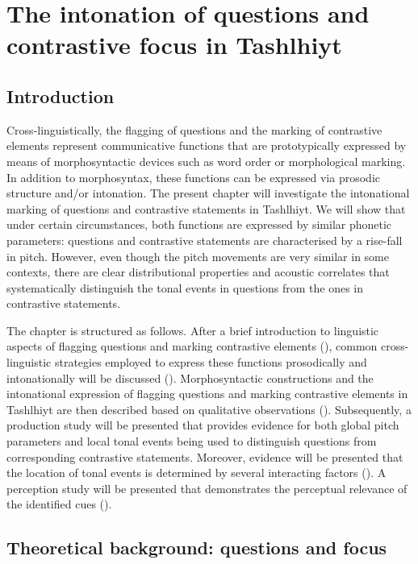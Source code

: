 \chapter{The intonation of questions and contrastive focus in Tashlhiyt}
\section{Introduction}
Cross-linguistically, the flagging of questions and the marking of contrastive elements represent communicative functions that are prototypically expressed by means of morphosyntactic devices such as word order or morphological marking. In addition to morphosyntax, these functions can be expressed via prosodic structure and/or intonation. The present chapter will investigate the intonational marking of questions and contrastive statements in Tashlhiyt. We will show that under certain circumstances, both functions are expressed by similar phonetic parameters: questions and contrastive statements are characterised by a rise-fall in pitch. However, even though the pitch movements are very similar in some contexts, there are clear distributional properties and acoustic correlates that systematically distinguish the tonal events in questions from the ones in contrastive statements.

The chapter is structured as follows. After a brief introduction to linguistic aspects of flagging questions and marking contrastive elements (), common cross-linguistic strategies employed to express these functions prosodically and intonationally will be discussed (). Morphosyntactic constructions and the intonational expression of flagging questions and marking contrastive elements in Tashlhiyt are then described based on qualitative observations (). Subsequently, a production study will be presented that provides evidence for both global pitch parameters and local tonal events being used to distinguish questions from corresponding contrastive statements. Moreover, evidence will be presented that the location of tonal events is determined by several interacting factors (). A perception study will be presented that demonstrates the perceptual relevance of the identified cues ().

\section{Theoretical background: questions and focus}\label{sec:5.2}
